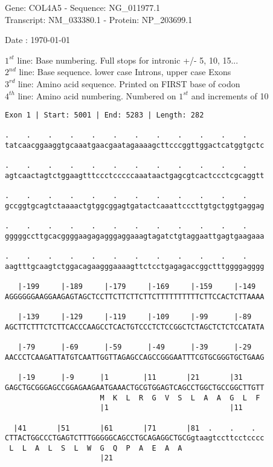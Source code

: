 \documentclass{article}
\begin{document}
\begin{center}
\begin{large}
Gene: COL4A5 - Sequence: NG\_011977.1\\
Transcript: NM\_033380.1 - Protein: NP\_203699.1
 
 Date : \today
\end{large}
\end{center}
$1^{st}$ line: Base numbering. Full stops for intronic +/- 5, 10, 15...\\
$2^{nd}$ line: Base sequence. lower case Introns, upper case Exons\\
$3^{rd}$ line: Amino acid sequence. Printed on FIRST base of codon\\
$4^{th}$ line: Amino acid numbering. Numbered on $1^{st}$ and increments of 10\\
\begin{Verbatim}[fontfamily=courier]
Exon 1 | Start: 5001 | End: 5283 | Length: 282

.    .    .    .    .    .    .    .    .    .    .    .    
tatcaacggaaggtgcaaatgaacgaatagaaaagcttcccggttggactcatggtgctc

.    .    .    .    .    .    .    .    .    .    .    .    
agtcaactagtctggaagtttccctcccccaaataactgagcgtcactccctcgcaggtt

.    .    .    .    .    .    .    .    .    .    .    .    
gccggtgcagtctaaaactgtggcggagtgatactcaaattcccttgtgctggtgaggag

.    .    .    .    .    .    .    .    .    .    .    .    
gggggccttgcacggggaagagagggaggaaagtagatctgtaggaattgagtgaagaaa

.    .    .    .    .    .    .    .    .    .    .    .    
aagtttgcaagtctggacagaagggaaaagttctcctgagagaccggctttggggagggg

   |-199     |-189     |-179     |-169     |-159     |-149  
AGGGGGGAAGGAAGAGTAGCTCCTTCTTCTTCTTCTTTTTTTTTTCTTCCACTCTTAAAA

   |-139     |-129     |-119     |-109     |-99      |-89   
AGCTTCTTTCTCTTCACCCAAGCCTCACTGTCCCTCTCCGGCTCTAGCTCTCTCCATATA

   |-79      |-69      |-59      |-49      |-39      |-29   
AACCCTCAAGATTATGTCAATTGGTTAGAGCCAGCCGGGAATTTCGTGCGGGTGCTGAAG

   |-19      |-9      |1        |11       |21       |31     
GAGCTGCGGGAGCCGGAGAAGAATGAAACTGCGTGGAGTCAGCCTGGCTGCCGGCTTGTT
                      M  K  L  R  G  V  S  L  A  A  G  L  F 
                      |1                            |11     

  |41       |51       |61       |71       |81  .    .    .  
CTTACTGGCCCTGAGTCTTTGGGGGCAGCCTGCAGAGGCTGCGgtaagtccttcctcccc
 L  L  A  L  S  L  W  G  Q  P  A  E  A  A                   
                      |21                                   

\end{Verbatim}
\end{document}
